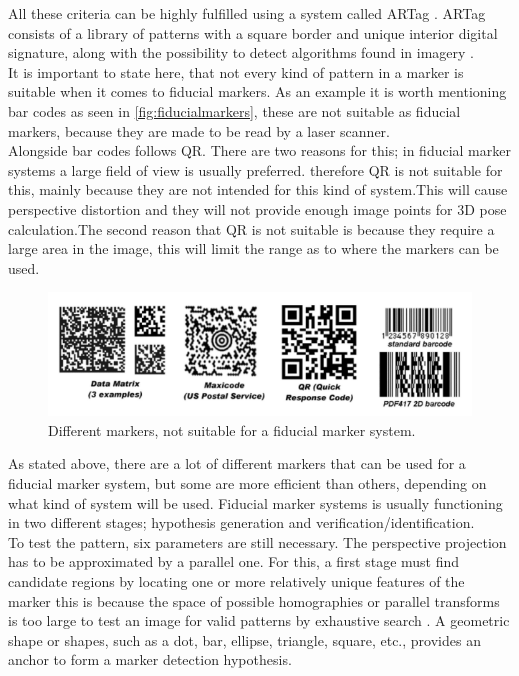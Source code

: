 All these criteria can be highly fulfilled using a system called ARTag \cite{fiducialARTag}. ARTag consists of a library of patterns with a square border and unique interior digital signature, along with the possibility to detect algorithms found in imagery \cite{fiducialMarkers}.\\

It is important to state here, that not every kind of pattern in a marker is suitable when it comes to fiducial markers\cite{fiducialMarkers}. As an example it is worth mentioning bar codes as seen in \autoref{fig:fiducialmarkers}, these are not suitable as fiducial markers, because they are made to be read by a laser scanner.\\
Alongside bar codes follows QR. There are two reasons for this; in fiducial marker systems a large field of view is usually preferred. therefore QR is not suitable for this, mainly because they are not intended for this kind of system.This will cause perspective distortion and they will not provide enough image points for 3D pose calculation.The second reason that QR is not suitable is because they require a large area in the image, this will limit the range as to where the markers can be used.\\ 


\begin{figure}[H]
	\centering
	\includegraphics[width=0.9\linewidth]{figure/Analysis/fiducialmarkers.png}
	\caption{Different markers, not suitable for a fiducial marker system.}
	\label{fig:fiducialmarkers}
\end{figure}


As stated above, there are a lot of different markers that can be used for a fiducial marker system, but some are more efficient than others, depending on what kind of system will be used.
Fiducial marker systems is usually functioning in two different stages; hypothesis generation and verification/identification.\\

To test the pattern, six parameters are still necessary. The perspective projection has to be approximated by a parallel one. For this, a first stage must find candidate regions by locating one or more relatively unique features of the marker this is because the space of possible homographies or parallel transforms is too large to test an image for valid patterns by exhaustive search \cite{fiducialMarkers}.
A geometric shape or shapes, such as a dot, bar, ellipse, triangle, square, etc., provides an anchor to form a marker detection hypothesis.\\

